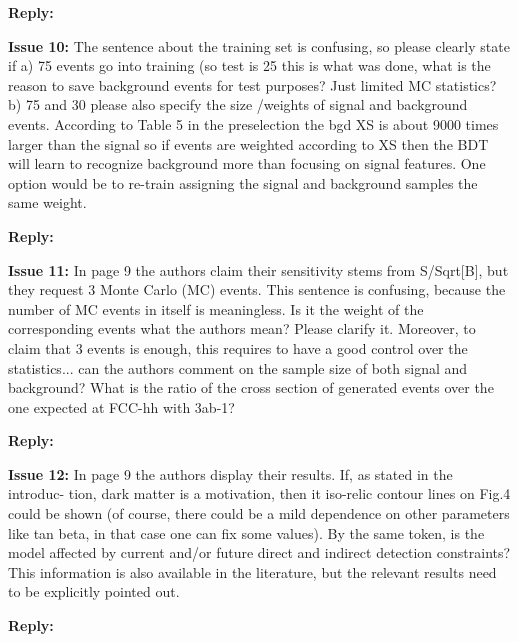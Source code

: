 \documentclass[12pt]{article}
\begin{document}
\noindent\textbf{Reply:} 

\bigskip

\noindent\textbf{Issue 10:} The sentence about the training set is confusing, so
please clearly state if a) 75 %
events go into training (so test is 25 %
this is what was done, what is the reason to save background events for test
purposes? Just limited MC statistics?  b) 75%
and 30%
please also specify the size /weights of signal and background events.
According to Table 5 in the preselection the bgd XS is about 9000 times larger
than the signal so if events are weighted according to XS then the BDT will
learn to recognize background more than focusing on signal features. One option
would be to re-train assigning the signal and background samples the same
weight.

\noindent\textbf{Reply:} 

\bigskip

\noindent\textbf{Issue 11:} In page 9 the authors claim their sensitivity stems
from S/Sqrt[B], but they request 3 Monte Carlo (MC) events. This sentence is
confusing, because the number of MC events in itself is meaningless. Is it the
weight of the corresponding events what the authors mean? Please clarify it.
Moreover, to claim that 3 events is enough, this requires to have a good
control over the statistics... can the authors comment on the sample size of
both signal and background? What is the ratio of the cross section of generated
events over the one expected at FCC-hh with 3ab-1?

\noindent\textbf{Reply:} 

\bigskip

\noindent\textbf{Issue 12:} In page 9 the authors display their results. If, as
stated in the introduc- tion, dark matter is a motivation, then it iso-relic
contour lines on Fig.4 could be shown (of course, there could be a mild
dependence on other parameters like tan beta, in that case one can fix some
values). By the same token, is the model affected by current and/or future
direct and indirect detection constraints? This information is also available
in the literature, but the relevant results need to be explicitly pointed out.

\noindent\textbf{Reply:} 
\end{document}
